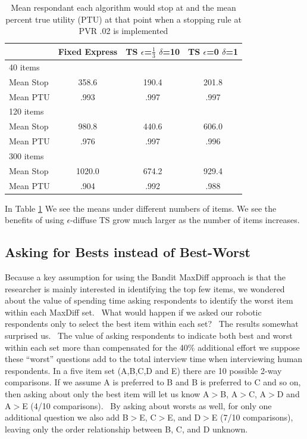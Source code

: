 \documentclass[mksc,blindrev]{informs3} %
\begin{document}
\begin{table}
\begin{center}
\begin{tabular}{l | c | c | c}
 & Fixed Express &  TS $\epsilon$=$\frac{1}{3}$ $\delta$=10  &TS $\epsilon$=0 $\delta$=1 \\
\hline
40 items&&&\\
Mean Stop& 358.6&  190.4 &  201.8\\
Mean PTU&.993 & .997 & .997 \\
\hline
120 items&&&\\
Mean Stop& 980.8 &  440.6 &  606.0 \\
Mean PTU& .976 & .997 & .996 \\
\hline
300 items&&&\\
Mean Stop& 1020.0 &  674.2 &  929.4\\
Mean PTU&.904 & .992 & .988 \\
\hline
\end{tabular}
\end{center}
\caption{Mean respondant each algorithm would stop at and the mean percent true utility (PTU) at that point when a stopping rule at PVR .02 is implemented}
\label{table:stop}
\end{table}
In Table \ref{table:stop} We see the means under different numbers of items. We see the benefits of using $\epsilon$-diffuse TS grow much larger as the number of items increases.
\subsection{Asking for Bests instead of Best-Worst}
Because a key assumption for using the Bandit MaxDiff approach is that the researcher is mainly interested in identifying the top few items, we wondered about the value of spending time asking respondents to identify the worst item within each MaxDiff set.  What would happen if we asked our robotic respondents only to select the best item within each set?  The results somewhat surprised us.  The value of asking respondents to indicate both best and worst within each set more than compensated for the 40\% additional effort we suppose these “worst” questions add to the total interview time when interviewing human respondents.
In a five item set (A,B,C,D and E) there are 10 possible 2-way comparisons. If we assume A is preferred to B and B is preferred to C and so on, then asking about only the best item will let us know A$>$B, A$>$C, A$>$D and A$>$E (4/10 comparisons).  By asking about worsts as well, for only one additional question we also add B$>$E, C$>$E, and D$>$E (7/10 comparisons), leaving only the order relationship between B, C, and D unknown.
\end{document}
